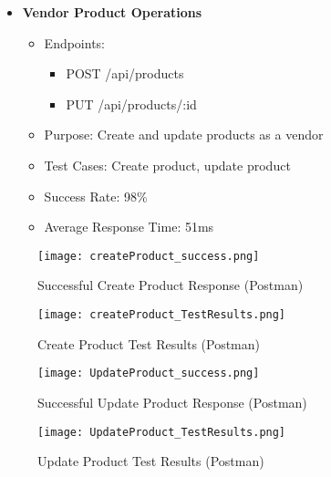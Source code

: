 \begin{itemize}
    \item \textbf{Vendor Product Operations}
    \begin{itemize}
        \item Endpoints:
        \begin{itemize}
            \item POST /api/products
            \item PUT /api/products/:id
        \end{itemize}
        \item Purpose: Create and update products as a vendor
        \item Test Cases: Create product, update product
        \item Success Rate: 98\%
        \item Average Response Time: 51ms
    \end{itemize}
\end{itemize}

\begin{figure}[h!]
    \centering
    \texttt{[image: createProduct\_success.png]}
    \caption{Successful Create Product Response (Postman)}
    \label{fig:createProduct_success}
\end{figure}

\begin{figure}[h!]
    \centering
    \texttt{[image: createProduct\_TestResults.png]}
    \caption{Create Product Test Results (Postman)}
    \label{fig:createProduct_testresults}
\end{figure}

\begin{figure}[h!]
    \centering
    \texttt{[image: UpdateProduct\_success.png]}
    \caption{Successful Update Product Response (Postman)}
    \label{fig:UpdateProduct_success}
\end{figure}

\begin{figure}[h!]
    \centering
    \texttt{[image: UpdateProduct\_TestResults.png]}
    \caption{Update Product Test Results (Postman)}
    \label{fig:UpdateProduct_testresults}
\end{figure}

